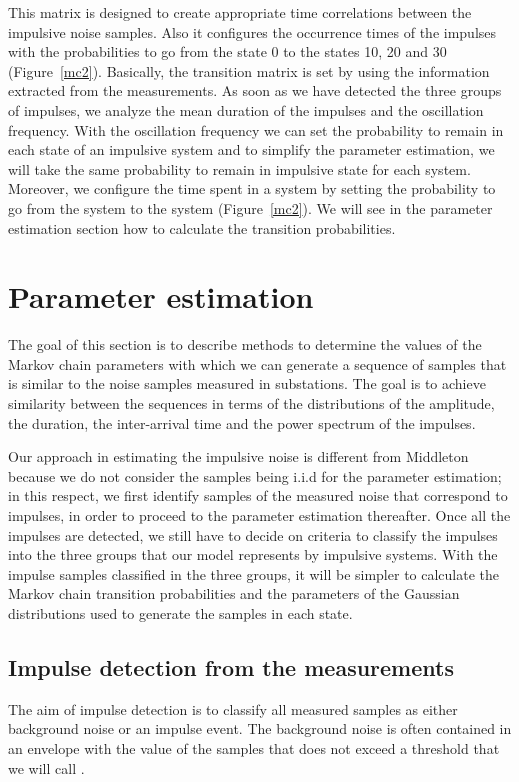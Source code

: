 \documentclass[journal]{IEEEtran}
\begin{document}
This matrix is designed to create appropriate time correlations between the impulsive noise samples. Also it configures the occurrence times of the impulses with the probabilities to go from the state 0 to the states 10, 20 and 30 (Figure~\ref{mc2}). Basically, the transition matrix is set by using the information extracted from the measurements. As soon as we have detected the three groups of impulses, we analyze the mean duration of the impulses and the oscillation frequency. With the oscillation frequency we can set the probability to remain in each state of an impulsive system and to simplify the parameter estimation, we will take the same probability to remain in impulsive state for each system. Moreover, we configure the time spent in a system by setting the probability to go from the system  to the system  (Figure~\ref{mc2}). We will see in the parameter estimation section how to calculate the transition probabilities.
\section{Parameter estimation}
The goal of this section is to describe methods to determine the values of the Markov chain parameters with which we can generate a sequence of samples that is similar to the noise samples measured in substations. The goal is to achieve similarity between the sequences in terms of the distributions of the amplitude, the duration, the inter-arrival time and the power spectrum of the impulses.\

Our approach in estimating the impulsive noise is different from Middleton~\cite{midd1} because we do not consider the samples being i.i.d for the parameter estimation; in this respect, we first identify samples of the measured noise that correspond to impulses, in order to proceed to the parameter estimation thereafter. Once all the impulses are detected, we still have to decide on criteria to classify the impulses into the three groups that our model represents by impulsive systems. With the impulse samples classified in the three groups, it will be simpler to calculate the Markov chain transition probabilities and the parameters of the Gaussian distributions used to generate the samples in each state.
\subsection{Impulse detection from the measurements}
The aim of impulse detection is to classify all measured samples as either background noise or an impulse event. The background noise is often contained in an envelope with the value of the samples that does not exceed a threshold that we will call .\
\end{document}

